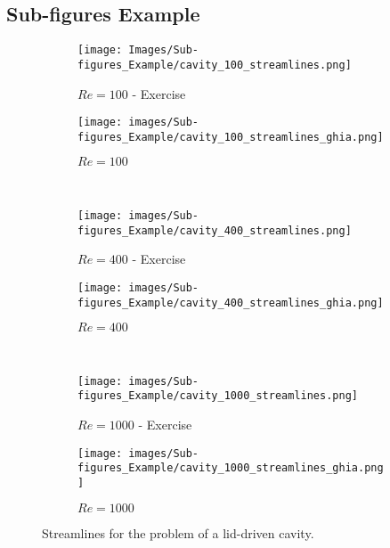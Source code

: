 \subsection{Sub-figures Example}
\begin{figure}[H]
    \centering
    \begin{subfigure}[t]{0.450\textwidth}
        \texttt{[image: Images/Sub-figures\_Example/cavity\_100\_streamlines.png]}
        \caption*{$Re = 100$ - Exercise}
    \end{subfigure}
    \begin{subfigure}[t]{0.441\textwidth}
        \texttt{[image: images/Sub-figures\_Example/cavity\_100\_streamlines\_ghia.png]}
        \caption*{$Re = 100$ \parencite{ghia_1982}}
    \end{subfigure}
    \\  %
    \begin{subfigure}[t]{0.450\textwidth}
        \texttt{[image: images/Sub-figures\_Example/cavity\_400\_streamlines.png]}
        \caption*{$Re = 400$ - Exercise}
    \end{subfigure}
    \begin{subfigure}[t]{0.438\textwidth}
        \texttt{[image: images/Sub-figures\_Example/cavity\_400\_streamlines\_ghia.png]}
        \caption*{$Re = 400$ \parencite{ghia_1982}}
    \end{subfigure}
    \\  %
    \begin{subfigure}[t]{0.450\textwidth}
        \texttt{[image: images/Sub-figures\_Example/cavity\_1000\_streamlines.png]}
        \caption*{$Re = 1000$ - Exercise}
    \end{subfigure}
    \begin{subfigure}[t]{0.438\textwidth}
        \texttt{[image: images/Sub-figures\_Example/cavity\_1000\_streamlines\_ghia.png]}
        \caption*{$Re = 1000$ \parencite{ghia_1982}}
    \end{subfigure}
    \caption[Streamline results]{Streamlines for the problem of a lid-driven cavity.}
    \label{fig:cavity_streamline}
\end{figure}